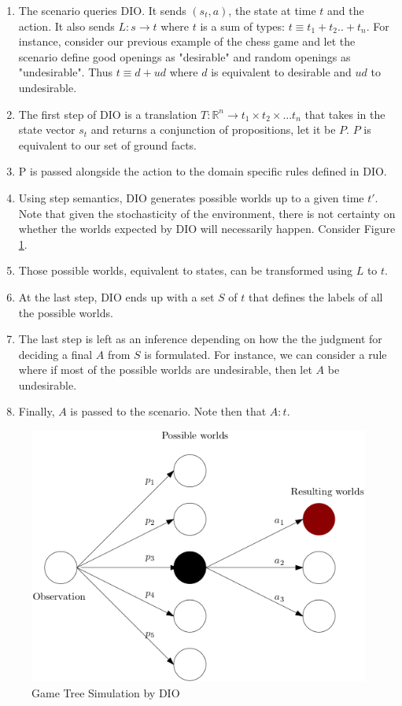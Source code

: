 \documentclass[a4paper,11pt]{article}
\theoremstyle{definition}
\begin{document}
\begin{enumerate}
  \item The scenario queries DIO. It sends $(s_t, a)$, the state at time $t$ and the action. It also sends $L : s \rightarrow t$ where $t$ is a sum of types: 
        $t \equiv t_1 + t_2 .. + t_n$. For instance, consider our previous example of the chess game and let the scenario define good openings as "desirable" and random openings as 
        "undesirable". Thus $t \equiv d + ud$ where $d$ is equivalent to desirable and $ud$ to undesirable. 
  \item The first step of DIO is a translation $T : \mathbb{R}^n \rightarrow t_1 \times t_2 \times ... t_n$ that takes in the state vector $s_t$ and returns a conjunction of propositions, let it be $P$. $P$ is equivalent to 
        our set of ground facts.
  \item P is passed alongside the action to the domain specific rules defined in DIO. 
  \item Using step semantics, DIO generates possible worlds up to a given time $t'$. Note that given the stochasticity of the environment, there is not certainty on
        whether the worlds expected by DIO will necessarily happen. Consider Figure \ref{fig:diosim}.
  \item Those possible worlds, equivalent to states, can be transformed using $L$ to $t$. 
  \item At the last step, DIO ends up with a set $S$ of $t$ that defines the labels of all the possible worlds.
  \item The last step is left as an inference depending on how the the judgment for deciding a final $A$ from $S$ 
        is formulated. For instance, we can consider a rule where if most of the possible worlds are undesirable, then let $A$ be undesirable.
  \item Finally, $A$ is passed to the scenario. Note then that $A : t$. 
\end{enumerate}

\begin{figure}[H]
  \centering
  \includegraphics[scale=0.55]{scworlds.png}
  \caption{Game Tree Simulation by DIO}
  \label{fig:diosim}
\end{figure}
\end{document}
